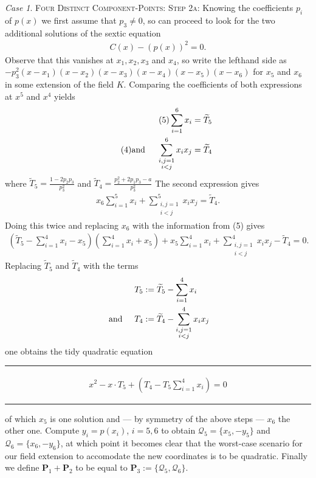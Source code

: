 \documentclass[english,11pt,a4paper]{article}
\theoremstyle{definition}
\theoremstyle{remark}
\theoremstyle{case}
\newtheorem{case}{Case}
\renewcommand{\P}{\mathbf{P}}
\newcommand{\q}{\mathcal{Q}}
\newcommand{\Tfi}{\widetilde T_5}
\newcommand{\Tfo}{\widetilde T_4}
\newcommand{\sumfo}{\sum_{i=1}^4 x_i}
\newcommand{\sumsumfo}{\sum_{\substack{i,j=1\\i<j}}^4 x_i x_j}
\begin{document}
\begin{case} {\scshape Four Distinct Component-Points:}
	{\scshape Step 2a:} Knowing the coefficients $p_i$ of $p(x)$ we first assume that $p_3 \neq 0$, so can proceed to look for the two additional solutions of the sextic equation
	\begin{align*}
		\tag{$\star$} \label{sex} C(x)-\left(p(x)\right)^2 = 0.
	\end{align*}
	Observe that this vanishes at $x_1, x_2, x_3$ and $x_4$, so write the lefthand side as $-p_3^2(x-x_1)(x-x_2)(x-x_3)(x-x_4)(x-x_5)(x-x_6)$ for $x_5$ and $x_6$ in some extension of the field $K$. Comparing the coefficients of both expressions at $x^5$ and $x^4$ yields
	\begin{align*}
		\tag{5} \sum_{i=1}^6 x_i &= \Tfi\\
		\label{four} \tag{4} \text{and\hspace{5mm}} \sum_{\substack{i,j=1\\i<j}}^6 x_i x_j &= \Tfo
	\end{align*}
	where $\Tfi = \frac{1-2 p_2 p_3}{p_3^2}$ and $\Tfo = \frac{p_2^2+2 p_1 p_3-a}{p_3^2}$
	The second expression gives
	\begin{align*}
		x_6 \sum_{i=1}^5 x_i + \sum_{\substack{i,j=1\\i<j}}^5 x_i x_j = \Tfo.
	\end{align*}
	Doing this twice and replacing $x_6$ with the information from (5) gives
	\begin{align*}
		\left(\Tfi - \sumfo - x_5\right) \left(\sumfo + x_5\right) + x_5\sumfo + \sumsumfo - \Tfo = 0.
	\end{align*}
	Replacing $\Tfi$ and $\Tfo$ with the terms
	\begin{align*}T_5 &:= \Tfi - \sumfo \\
		\text{ and\hspace{5mm}} T_4 &:= \Tfo - \sumsumfo
	\end{align*}
	one obtains the tidy quadratic equation

	\vspace{-3mm}
	\rule{\textwidth}{0.005in}
	\begin{align*}
		\tag{$\dagger$} \label{dagger} x^2 - x \cdot T_5 + \left(T_4 - T_5 \sumfo \right) = 0
	\end{align*}
	\rule{\textwidth}{0.005in}

	of which $x_5$ is one solution and --- by symmetry of the above steps --- $x_6$ the other one. Compute $y_i=p(x_i)$, $i=5,6$ to obtain $\q_5 = \{ x_5, -y_5 \}$ and $\q_6 = \{ x_6, -y_6 \}$, at which point it becomes clear that the worst-case scenario for our field extension to accomodate the new coordinates is to be quadratic. Finally we define $\P_1 + \P_2$ to be equal to $\P_3 := \{ \q_5, \q_6 \}$.


\end{case}
\end{document}
